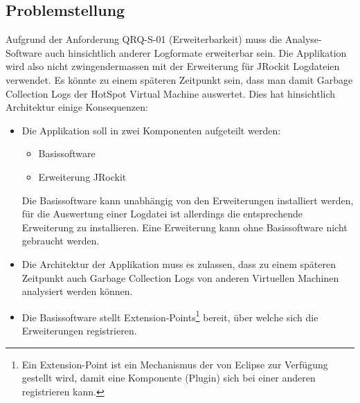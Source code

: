 \subsection{Problemstellung}\label{konzept_uebersicht}
Aufgrund der Anforderung QRQ-S-01 (Erweiterbarkeit) muss die Analyse-Software auch hinsichtlich anderer Logformate erweiterbar sein. Die Applikation wird also nicht zwingendermassen mit der Erweiterung für JRockit Logdateien verwendet. Es könnte zu einem späteren Zeitpunkt sein, dass man damit Garbage Collection Logs der HotSpot Virtual Machine auswertet. Dies hat hinsichtlich Architektur einige Konsequenzen:
\begin{itemize}
	\item Die Applikation soll in zwei Komponenten aufgeteilt werden:
		\begin{itemize}
			\item Basissoftware
			\item Erweiterung JRockit
		\end{itemize}
		Die Basissoftware kann unabhängig von den Erweiterungen installiert werden, für die Auswertung einer Logdatei ist allerdings die entsprechende Erweiterung zu installieren. Eine Erweiterung kann ohne Basissoftware nicht gebraucht werden.
	\item Die Architektur der Applikation muss es zulassen, dass zu einem späteren Zeitpunkt auch Garbage Collection Logs von anderen Virtuellen Machinen analysiert werden können.
	\item Die Basissoftware stellt Extension-Points\footnote{Ein Extension-Point ist ein Mechanismus der von Eclipse zur Verfügung gestellt wird, damit eine Komponente (Plugin) sich bei einer anderen registrieren kann.} bereit, über welche sich die Erweiterungen  registrieren.
\end{itemize}

